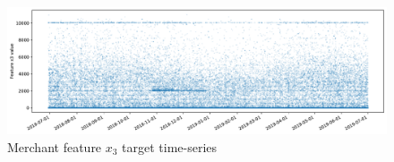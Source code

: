 \documentclass[sigconf]{acmart}
\begin{document}
\begin{figure}[!htb]
    \begin{center}
      \includegraphics[scale=0.25]{figures/merchant-x3-target.pdf}
      \caption{Merchant feature $x_3$ target time-series}
      \label{fig:merchant-x3-target}
    \end{center}
\end{figure}
\end{document}
